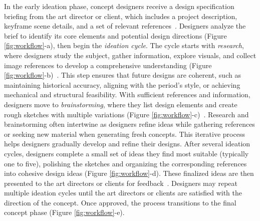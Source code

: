 In the early ideation phase, concept designers receive a design specification briefing from the art director or client, which includes a project description, keyframe scene details, and a set of relevant references~\cite{80lv2020}. Designers analyze the brief to identify its core elements and potential design directions (Figure \ref{fig:workflow}-a), then begin the \textit{ideation cycle}. The cycle starts with \textit{research}, where designers study the subject, gather information, explore visuals, and collect image references to develop a comprehensive understanding (Figure \ref{fig:workflow}-b)~\cite{iterationandreference2023}. This step ensures that future designs are coherent, such as maintaining historical accuracy, aligning with the period's style, or achieving mechanical and structural feasibility. With sufficient references and information, designers move to \textit{brainstorming}, where they list design elements and create rough sketches with multiple variations (Figure \ref{fig:workflow}-c)~\cite{skillful2005}. Research and brainstorming often intertwine as designers refine ideas while gathering references or seeking new material when generating fresh concepts. This iterative process helps designers gradually develop and refine their designs. After several ideation cycles, designers complete a small set of ideas they find most suitable (typically one to five), polishing the sketches and organizing the corresponding references into cohesive design ideas (Figure \ref{fig:workflow}-d). These finalized ideas are then presented to the art directors or clients for feedback~\cite{80lv2020}. Designers may repeat multiple ideation cycles until the art directors or clients are satisfied with the direction of the concept. Once approved, the process transitions to the final concept phase (Figure \ref{fig:workflow}-e).



